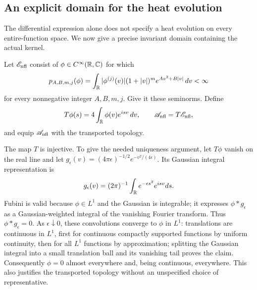 \subsection{An explicit domain for the heat evolution}
The differential expression alone does not specify a heat evolution
on every entire-function space. We now give a precise invariant domain
containing the actual kernel.

\begin{definition}
Let $\mathscr E_{\rm nfl}$ consist of $\phi\in C^\infty(\mathbb R,\mathbb C)$ for which
\[
p_{A,B,m,j}(\phi)=\int_\mathbb R |\phi^{(j)}(v)|(1+|v|)^m
                          e^{Av^2+B|v|}\,dv<\infty
\]
for every nonnegative integer $A,B,m,j$. Give it these seminorms.
Define
\[
T\phi(s)=4\int_\mathbb R\phi(v)e^{isv}\,dv,\qquad \mathscr A_{\rm nfl}=T\mathscr E_{\rm nfl},
\]
and equip $\mathscr A_{\rm nfl}$ with the transported topology.
\end{definition}

The map $T$ is injective. To give the needed uniqueness argument,
let $T\phi$ vanish on the real line and let
$g_\epsilon(v)=(4\pi\epsilon)^{-1/2}e^{-v^2/(4\epsilon)}$.
Its Gaussian integral representation is
\[
 g_\epsilon(v)=(2\pi)^{-1}\int_\mathbb R e^{-\epsilon s^2}e^{isv}ds.
\]
Fubini is valid because $\phi\in L^1$ and the Gaussian is integrable;
it expresses $\phi*g_\epsilon$ as a Gaussian-weighted integral of the
vanishing Fourier transform. Thus $\phi*g_\epsilon=0$.
As $\epsilon\downarrow0$, these convolutions converge to $\phi$ in
$L^1$: translations are continuous in $L^1$, first for continuous
compactly supported functions by uniform continuity, then for all
$L^1$ functions by approximation; splitting the Gaussian integral
into a small translation ball and its vanishing tail proves the claim.
Consequently $\phi=0$ almost everywhere and, being continuous, everywhere.
This also justifies the transported topology without an unspecified
choice of representative.

